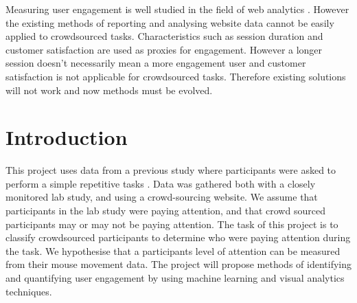 \documentclass{article}
\begin{document}
Measuring user engagement is well studied in the field of web analytics \cite{peterson2008measuring}.
However the existing methods of reporting and analysing website data cannot be easily applied to crowdsourced tasks.    
Characteristics such as session duration and customer satisfaction are used as proxies for engagement.
However a longer session doesn't necessarily mean a more engagement user and customer satisfaction is not applicable for crowdsourced tasks.
Therefore existing solutions will not work and now methods must be evolved.





\section{Introduction}

This project uses data from a previous study where participants were asked to perform a simple repetitive tasks \cite{tom2018risk}.
Data was gathered both with a closely monitored lab study, and using a crowd-sourcing website.
We assume that participants in the lab study were paying attention, and that crowd sourced participants may or may not be paying attention.
The task of this project is to classify crowdsourced participants to determine who were paying attention during the task.
We hypothesise that a participants level of attention can be measured from their mouse movement data.
The project will propose methods of identifying and quantifying user engagement by using machine learning and visual analytics techniques.
\end{document}
